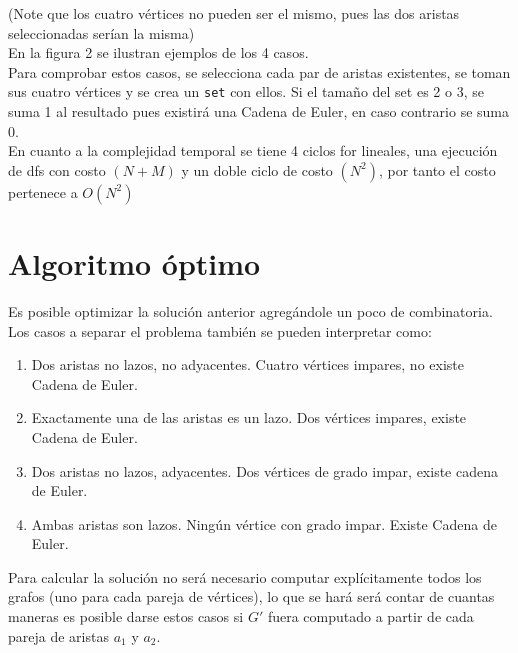 \documentclass[a4paper,12pt,twocolumn]{article}
\begin{document}
	(Note que los cuatro vértices no pueden ser el mismo, pues las dos aristas seleccionadas serían la misma)\\
	
	En la figura 2 se ilustran ejemplos de los 4 casos.\\	 
	 
	
	Para comprobar estos casos, se selecciona cada par de aristas existentes, se toman sus cuatro vértices y se crea un \texttt{\ttfamily set} con ellos. Si el tamaño del set es 2 o 3, se suma 1 al resultado pues existirá una Cadena de Euler, en caso contrario se suma 0.\\
	
	En cuanto a la complejidad temporal se tiene 4 ciclos for lineales, una ejecución de dfs con costo $(N + M)$ y un doble ciclo de costo $(N^2)$, por tanto el costo pertenece a $O(N^2)$\\

\section{Algoritmo óptimo}

	Es posible optimizar la solución anterior agregándole un poco de combinatoria. Los casos a separar el problema también se pueden interpretar como:
	
	\begin{enumerate}
		\item Dos aristas no lazos, no adyacentes. Cuatro vértices impares, no existe Cadena de Euler.
		\item Exactamente una de las aristas es un lazo. Dos vértices impares, existe Cadena de Euler.
		\item Dos aristas no lazos, adyacentes. Dos vértices de grado impar, existe cadena de Euler.
		\item Ambas aristas son lazos. Ningún vértice con grado impar. Existe Cadena de Euler.
	\end{enumerate}
	Para calcular la solución no será necesario computar explícitamente todos los grafos (uno para cada pareja de vértices), lo que se hará será contar de cuantas maneras es posible darse estos casos si $G'$ fuera computado a partir de cada pareja de aristas $a_1$ y $a_2$.\\
	
\end{document}
